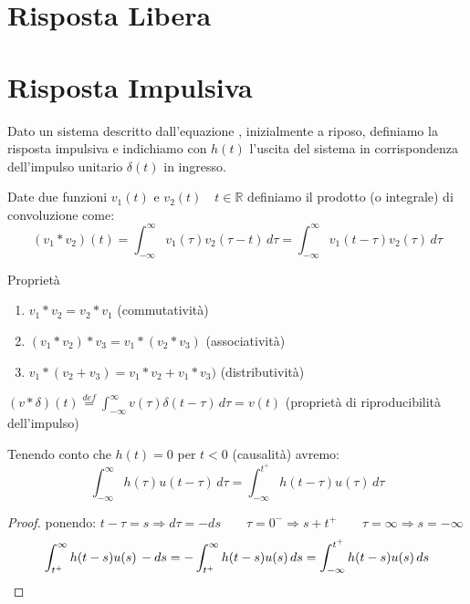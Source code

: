 \section{Risposta Libera}



\section{Risposta Impulsiva}

\begin{definition}
	Dato un sistema descritto dall'equazione %
	, inizialmente a riposo, definiamo la risposta impulsiva e indichiamo con $h(t)$ l'uscita del sistema in corrispondenza dell'impulso unitario $\delta (t)$ in ingresso.
\end{definition}

\begin{definition}
	Date due funzioni $v_1(t)$ e $v_2(t) \quad t\in\mathbb{R} $ definiamo il prodotto (o integrale) di convoluzione come:
	\begin{equation*}
		(v_1 * v_2)(t) 
		= \int_{-\infty}^{\infty}v_1(\tau)v_2(\tau - t)\,d\tau 
		= \int_{-\infty}^{\infty}v_1(t - \tau)v_2(\tau )\,d\tau
	\end{equation*}
	
	Proprietà
	\begin{enumerate}
		\item $v_1 * v_2 = v_2 * v_1 $ (commutatività)
		\item $(v_1 * v_2) * v_3  = v_1 * (v_2 * v_3) $ (associatività)
		\item $v_1 * (v_2 + v_3)  = v_1 * v_2 + v_1 * v_3)$ (distributività)
	\end{enumerate}

\begin{oss}
	$(v *\delta)(t)\overset{def}{=} \int_{-\infty}^{\infty}v(\tau)\delta(t - \tau)\,d\tau = v(t)$ (proprietà di riproducibilità dell'impulso)
\end{oss}
\end{definition}
Tenendo conto che $h(t)=0$ per $t<0$ (causalità) avremo:
\begin{equation*}
	\int_{-\infty}^{\infty}h(\tau)u(t - \tau)\,d\tau 
	= \int_{-\infty}^{t^+}h(t - \tau)u(\tau)\,d\tau
\end{equation*}
\begin{proof}
ponendo:  $t-\tau = s \Rightarrow d\tau = - ds 
\qquad \tau = 0^-  \Rightarrow s+t^+ 
\qquad \tau=\infty \Rightarrow s = -\infty$
\[
\int_{t^+}^{\infty}h(t-s)u(s)\,-ds 
=-\int_{t^+}^{\infty}h(t-s)u(s)\,ds
=\int_{-\infty}^{t^+}h(t-s)u(s)\,ds
\qedhere
\]
\end{proof}

